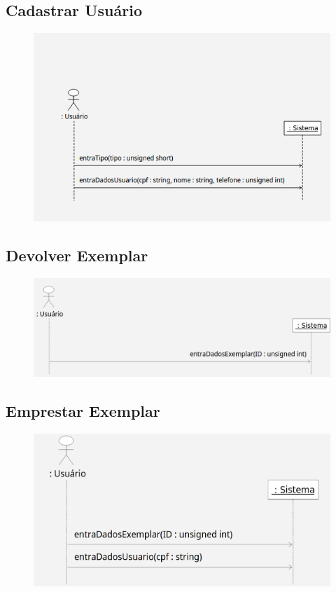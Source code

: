 \documentclass[
	12pt,				%
	openright,			%
	oneside,			%
	a4paper,			%
	english,			%
	brazil				%
	]{abntex2}
\begin{document}
\subsection{Cadastrar Usuário}

\begin{figure}[H]
\includegraphics[width=1\textwidth]{DSSCadastraUsuario}
\label{fig:figura4}
\end{figure}

\subsection{Devolver Exemplar}

\begin{figure}[H]
\includegraphics[width=1\textwidth]{DSSDevolverExemplar}
\label{fig:figura5}
\end{figure}

\subsection{Emprestar Exemplar}

\begin{figure}[H]
\includegraphics[width=1\textwidth]{DSSEmprestarExemplar}
\label{fig:figura6}
\end{figure}
\end{document}
